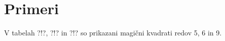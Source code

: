 \documentclass[a4paper,12pt]{article}
\begin{document}

\section{Primeri}

V tabelah ?!?, ?!? in ?!? so prikazani
magični kvadrati redov 5, 6 in 9.





\newpage





\end{document}
